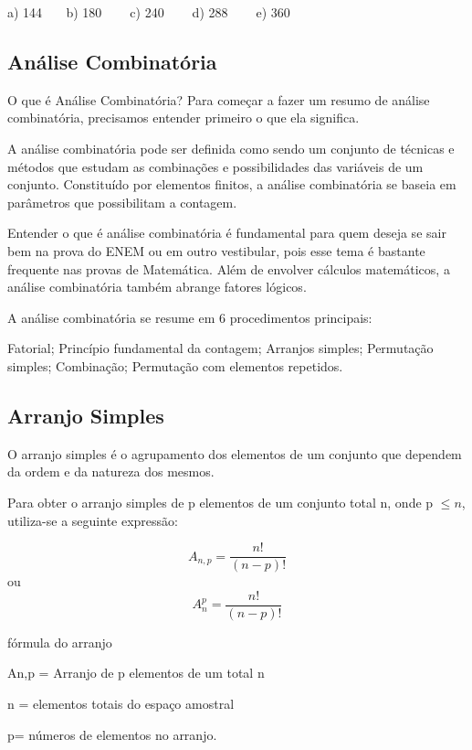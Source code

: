 \begin{multicols*}{2}
\begin{enumerate}
              a) 144$ \ \ \ \ \ \ \ $ b) 180 $ \ \ \ \ \ \ \ $ c) 240 $ \ \ \ \ \ \ \ $ d) 288 $ \ \ \ \ \ \ \ $ e) 360

    \end{enumerate}

    \subsection{Análise Combinatória}


    O que é Análise Combinatória?
    Para começar a fazer um resumo de análise combinatória, precisamos entender primeiro o que ela significa.

    A análise combinatória pode ser definida como sendo um conjunto de técnicas e métodos que estudam as combinações e possibilidades das variáveis de um conjunto. Constituído por elementos finitos, a análise combinatória se baseia em parâmetros que possibilitam a contagem.

    Entender o que é análise combinatória é fundamental para quem deseja se sair bem na prova do ENEM ou em outro vestibular, pois esse tema é bastante frequente nas provas de Matemática. Além de envolver cálculos matemáticos, a análise combinatória também abrange fatores lógicos.

    A análise combinatória se resume em 6 procedimentos principais:

    Fatorial;
    Princípio fundamental da contagem;
    Arranjos simples;
    Permutação simples;
    Combinação;
    Permutação com elementos repetidos.

    \subsection{Arranjo Simples}

    O arranjo simples é o agrupamento dos elementos de um conjunto que dependem da ordem e da natureza dos mesmos.

    Para obter o arranjo simples de p elementos de um conjunto total  n, onde p $\leq n$, utiliza-se a seguinte expressão:

    $$  A_{n,p} = \dfrac{n!}{(n-p)!} $$ ou $$  A^p_n = \dfrac{n!}{(n-p)!} $$

    fórmula do arranjo

    An,p = Arranjo de p elementos de um total n

    n = elementos totais do espaço amostral

    p= números de elementos no arranjo.


\end{multicols*}
